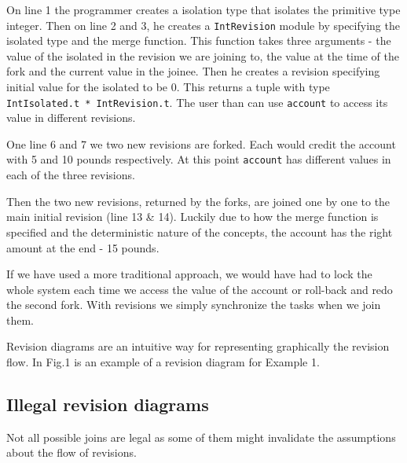 \documentclass[12pt,twoside,notitlepage]{report}
\begin{document}
 
On line 1 the programmer creates a isolation type that isolates the primitive type integer. Then on line 2 and 3, he creates a {\tt IntRevision} module by specifying the isolated type and the merge function. This function takes three arguments - the value of the isolated in the revision we are joining to, the value at the time of the fork and the current value in the joinee. Then he creates a revision specifying initial value for the isolated to be 0. This returns a tuple with type {\tt IntIsolated.t * IntRevision.t}. The user than can use {\tt account} to access its value in different revisions. 

One line 6 and 7 we two new revisions are forked. Each would credit the account with 5 and 10 pounds respectively. At this point {\tt account} has different values in each of the three revisions.

Then the two new revisions, returned by the forks, are joined one by one to the main initial revision (line 13 \& 14). Luckily due to how the merge function is specified and the deterministic nature of the concepts, the account has the right amount at the end - 15 pounds.

If we have used a more traditional approach, we would have had to lock the whole system each time we access the value of the account or roll-back and redo the second fork. With revisions we simply synchronize the tasks when we join them.

Revision diagrams are an intuitive way for representing graphically the revision flow. In Fig.1 is an example of a revision diagram for Example 1. 

\subsection{Illegal revision diagrams}
Not all possible joins are legal as some of them might invalidate the assumptions about the flow of revisions.

 
\end{document}
